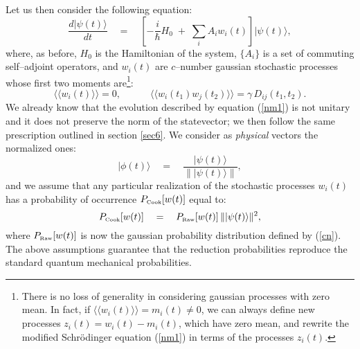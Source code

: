 \documentclass[10pt,a4paper]{article}
\newcommand{\llangle}{\langle\!\langle}
\newcommand{\rrangle}{\rangle\!\rangle}
\begin{document}
Let us then consider the following equation:
\begin{equation} \label{nm1}
\frac{d|\psi(t)\rangle}{dt} \quad = \quad \left[ -\frac{i}{\hbar}
H_{0}\; +\; \sum_{i} A_{i}w_{i}(t) \right] |\psi(t)\rangle,
\end{equation}
where, as before, $H_{0}$ is the Hamiltonian of the system, $\{
A_{i} \}$ is a set of commuting self--adjoint operators, and
$w_{i}(t)$ are $c$--number gaussian stochastic processes whose
first two moments are\footnote{There is no loss of generality in
considering gaussian processes with zero mean. In fact, if
$\llangle w_{i}(t) \rrangle = m_{i}(t) \neq 0$, we can always
define new processes $z_{i}(t) = w_{i}(t) - m_{i}(t)$, which have
zero mean, and rewrite the modified Schr\"odinger equation (\ref{nm1}) in
terms of the processes $z_{i}(t)$.}:
\begin{equation} \label{cn}
\llangle w_{i}(t) \rrangle = 0, \qquad \quad \llangle w_{i}(t_{1})
w_{j}(t_{2})\rrangle = \gamma\,D_{ij}(t_{1}, t_{2}).
\end{equation}
We already know that the evolution described by equation
(\ref{nm1}) is not unitary and it does not preserve the norm of
the statevector; we then follow the same prescription outlined in
section \ref{sec6}. We consider as {\it physical} vectors the
normalized ones:
\begin{equation} \label{co2}
|\phi(t)\rangle \quad = \quad \frac{|\psi(t)\rangle}{\|
|\psi(t)\rangle \|},
\end{equation}
and we assume that any particular realization of the stochastic
processes $w_{i}(t)$  has a probability of occurrence
$P_{\makebox{\tiny Cook}}[w(t)]$ equal to:
\begin{equation} \label{prob2}
P_{\makebox{\tiny Cook}}[w(t)] \quad = \quad P_{\makebox{\tiny
Raw}}[w(t)]\, \||\psi(t)\rangle\|^{2},
\end{equation}
where $P_{\makebox{\tiny Raw}}[w(t)]$ is now the gaussian
probability distribution defined by (\ref{cn}).  The above
assumptions guarantee that the reduction probabilities reproduce
the standard quantum mechanical probabilities.
\end{document}
